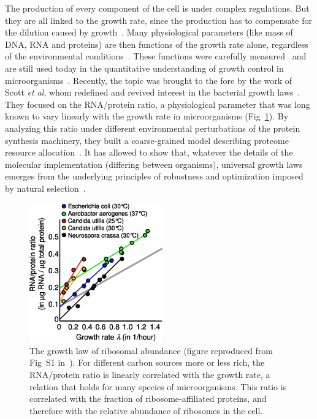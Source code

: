 The production of every component of the cell is under complex regulations.
But they are all linked to the growth rate, since the production has to compensate for the dilution caused by growth~\cite{monod_growth_1949}.
Many physiological parameters (like mass of DNA, RNA and proteins) are then functions of the growth rate alone, regardless of the environmental conditions~\cite{schaechter_dependency_1958,bremer_modulation_1996}.
These functions were carefully measured~\cite{bremer_modulation_1996} and are still used today in the quantitative understanding of growth control in microorganisms~\cite{ehrenberg_mediumdependent_2012}.
Recently, the topic was brought to the fore by the work of Scott \textit{et al}, whom redefined and revived interest in the bacterial growth laws~\cite{scott_bacterial_2011}.
They focused on the RNA/protein ratio, a physiological parameter that was long known to vary linearly with the growth rate in microorganisms (Fig~\ref{fig:scott_rnaprot}).
By analyzing this ratio under different environmental perturbations of the protein synthesis machinery, they built a coarse-grained model describing proteome resource allocation~\cite{scott_emergence_2014}.
It has allowed to show that, whatever the details of the molecular implementation (differing between organisms), universal growth laws emerges from the underlying principles of robustness and optimization imposed by natural selection~\cite{scott_emergence_2014}.  %

\begin{figure}[!h]
\centering
\includegraphics[height=6cm]{./Fig/Chapter1/scott_rnaprot.eps}
\caption{The growth law of ribosomal abundance (figure reproduced from Fig~S1 in~\cite{scott_interdependence_2010}).
For different carbon sources more or less rich, the RNA/protein ratio is linearly correlated with the growth rate, a relation that holds for many species of microorganisms.
This ratio is correlated with the fraction of ribosome-affiliated proteins, and therefore with the relative abundance of ribosomes in the cell.
}
\label{fig:scott_rnaprot}
\end{figure}

